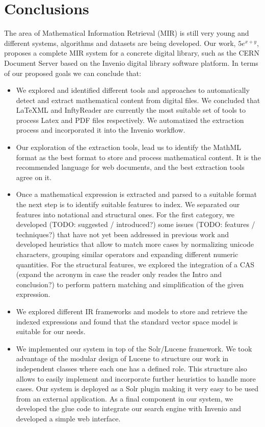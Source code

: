 \chapter{Conclusions}
\label{chap-conclusions}

The area of Mathematical Information Retrieval (MIR) is still very young and different systems, algorithms and datasets are being developed. Our work, $5e^{x+y}$, proposes a complete MIR system for a concrete digital library, such as the CERN Document Server based on the Invenio digital library software platform. In terms of our proposed goals we can conclude that:

\begin{itemize}
\item We explored and identified different tools and approaches to automatically detect and extract mathematical content from digital files. We concluded that LaTeXML and InftyReader are currently the most suitable set of tools to process Latex and PDF files respectively. We automatized the extraction process and incorporated it into the Invenio workflow.
\item Our exploration of the extraction tools, lead us to identify the MathML format as the best format to store and process mathematical content. It is the recommended language for web documents, and the best extraction tools agree on it.
\item Once a mathematical expression is extracted and parsed to a suitable format the next step is to identify suitable features to index. We separated our features into notational and structural ones. For the first category, we developed (TODO: suggested / introduced?) some issues (TODO: features / techniques?) that have not yet been addressed in previous work and developed heuristics that allow to match more cases by normalizing unicode characters, grouping similar operators and expanding different numeric quantities. For the structural features, we explored the integration of a CAS (expand the acronym in case the reader only reades the Intro and conclusion?) to perform pattern matching and simplification of the given expression. 
\item We explored different IR frameworks and models to store and retrieve the indexed expressions and found that the standard vector space model is suitable for our needs.  
\item We implemented our system in top of the Solr/Lucene framework. We took advantage of the modular design of Lucene to structure our work in independent classes where each one has a defined role. This structure also allows to easily implement and incorporate further heuristics to handle more cases. Our system is deployed as a Solr plugin making it very easy to be used from an external application. As a final component in our system, we developed the glue code to integrate our search engine with Invenio and developed a simple web interface.

\end{itemize}
